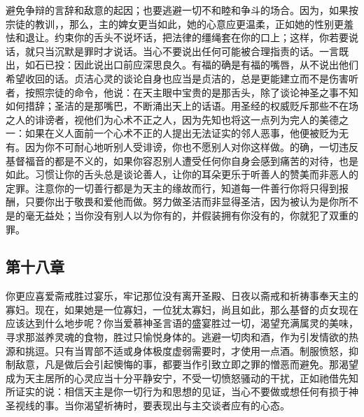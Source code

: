 避免争辩的言辞和敌意的起因；也要逃避一切不和睦和争斗的场合。因为，如果按宗徒的教训，，那么，主的婢女更当如此，她的心意应更温柔，正如她的性别更羞怯和退让。约束你的舌头不说坏话，把法律的缰绳套在你的口上；这样，你若要说话，就只当沉默是罪时才说话。当心不要说出任何可能被合理指责的话。一言既出，如石已投：因此说出口前应深思良久。有福的确是有福的嘴唇，从不说出他们希望收回的话。贞洁心灵的谈论自身也应当是贞洁的，总是更能建立而不是伤害听者，按照宗徒的命令，他说：在天主眼中宝贵的是那舌头，除了谈论神圣之事不知如何措辞；圣洁的是那嘴巴，不断涌出天上的话语。用圣经的权威贬斥那些不在场之人的诽谤者，视他们为心术不正之人，因为先知也将这一点列为完人的美德之一：如果在义人面前一个心术不正的人提出无法证实的邻人恶事，他便被贬为无有。因为你不可耐心地听别人受诽谤，你也不愿别人对你这样做。的确，一切违反基督福音的都是不义的，如果你容忍别人遭受任何你自身会感到痛苦的对待，也是如此。习惯让你的舌头总是谈论善人，让你的耳朵更乐于听善人的赞美而非恶人的定罪。注意你的一切善行都是为天主的缘故而行，知道每一件善行你将只得到报酬，只要你出于敬畏和爱他而做。努力做圣洁而非显得圣洁，因为被认为是你所不是的毫无益处；当你没有别人以为你有的，并假装拥有你没有的，你就犯了双重的罪。\par


\subsection{第十八章}

你更应喜爱斋戒胜过宴乐，牢记那位没有离开圣殿、日夜以斋戒和祈祷事奉天主的寡妇。现在，如果她是一位寡妇，一位犹太寡妇，尚且如此，那么基督的贞女现在应该达到什么地步呢？你当爱慕神圣言语的盛宴胜过一切，渴望充满属灵的美味，寻求那滋养灵魂的食物，胜过只愉悦身体的。逃避一切肉和酒，作为引发情欲的热源和挑逗。只有当胃部不适或身体极度虚弱需要时，才使用一点酒。制服愤怒，抑制敌意，凡是做后会引起懊悔的事，都要当作引致立即之罪的憎恶而避免。那渴望成为天主居所的心灵应当十分平静安宁，不受一切愤怒骚动的干扰，正如祂借先知所证实的说：相信天主是你一切行为和思想的见证，当心不要做或想任何有损于神圣视线的事。当你渴望祈祷时，要表现出与主交谈者应有的心态。\par


